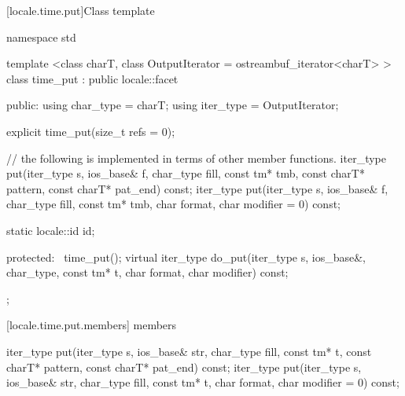 [locale.time.put]{Class template }

%
\begin{codeblock}
namespace std {
  template <class charT, class OutputIterator = ostreambuf_iterator<charT> >
  class time_put : public locale::facet {
  public:
    using char_type = charT;
    using iter_type = OutputIterator;

    explicit time_put(size_t refs = 0);

    // the following is implemented in terms of other member functions.
    iter_type put(iter_type s, ios_base& f, char_type fill, const tm* tmb,
                  const charT* pattern, const charT* pat_end) const;
    iter_type put(iter_type s, ios_base& f, char_type fill,
                  const tm* tmb, char format, char modifier = 0) const;

    static locale::id id;

  protected:
    ~time_put();
    virtual iter_type do_put(iter_type s, ios_base&, char_type, const tm* t,
                             char format, char modifier) const;
  };
}
\end{codeblock}

[locale.time.put.members]{ members}

%
%
\begin{itemdecl}
iter_type put(iter_type s, ios_base& str, char_type fill, const tm* t,
              const charT* pattern, const charT* pat_end) const;
iter_type put(iter_type s, ios_base& str, char_type fill, const tm* t,
              char format, char modifier = 0) const;
\end{itemdecl}

